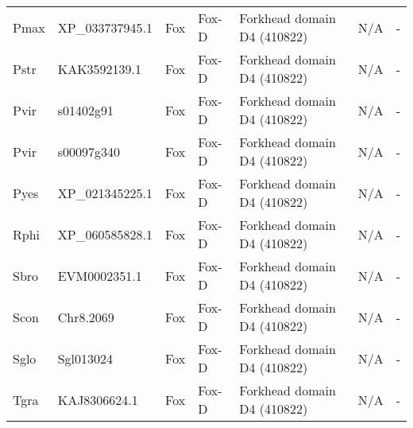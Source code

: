 \documentclass[../main.tex]{subfiles}
\begin{document}
\begin{landscape}
\begin{longtable}{lllllll}
		Pmax           & XP\_033737945.1       & Fox            & Fox-D               & Forkhead domain D4 (410822)                 & N/A                                                                    & -                    \\
		Pstr           & KAK3592139.1          & Fox            & Fox-D               & Forkhead domain D4 (410822)                 & N/A                                                                    & -                    \\
		Pvir           & s01402g91             & Fox            & Fox-D               & Forkhead domain D4 (410822)                 & N/A                                                                    & -                    \\
		Pvir           & s00097g340            & Fox            & Fox-D               & Forkhead domain D4 (410822)                 & N/A                                                                    & -                    \\
		Pyes           & XP\_021345225.1       & Fox            & Fox-D               & Forkhead domain D4 (410822)                 & N/A                                                                    & -                    \\
		Rphi           & XP\_060585828.1       & Fox            & Fox-D               & Forkhead domain D4 (410822)                 & N/A                                                                    & -                    \\
		Sbro           & EVM0002351.1          & Fox            & Fox-D               & Forkhead domain D4 (410822)                 & N/A                                                                    & -                    \\
		Scon           & Chr8.2069             & Fox            & Fox-D               & Forkhead domain D4 (410822)                 & N/A                                                                    & -                    \\
		Sglo           & Sgl013024             & Fox            & Fox-D               & Forkhead domain D4 (410822)                 & N/A                                                                    & -                    \\
		Tgra           & KAJ8306624.1          & Fox            & Fox-D               & Forkhead domain D4 (410822)                 & N/A                                                                    & -                    \\

\end{longtable}
\end{landscape}
\end{document}
